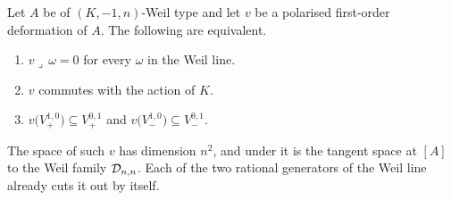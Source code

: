 \begin{proposition}
\label{prop:firstorder}
Let $A$ be of $(K,-1,n)$-Weil type and let $v$ be a polarised first-order
deformation of $A$. The following are equivalent.
\begin{enumerate}[label=\textup{(\roman*)},nosep]
\item $v\lrcorner\,\omega=0$ for every $\omega$ in the Weil line.
\item $v$ commutes with the action of $K$.
\item $v\bigl(V_{+}^{1,0}\bigr)\subseteq V_{+}^{0,1}$ and
  $v\bigl(V_{-}^{1,0}\bigr)\subseteq V_{-}^{0,1}$.
\end{enumerate}
The space of such $v$ has dimension $n^{2}$, and under
 it is the tangent space at $[A]$ to the Weil family
$\mathcal{D}_{n,n}$. Each of the two rational generators of the Weil line already
cuts it out by itself.
\end{proposition}

